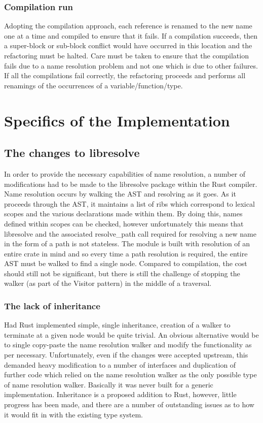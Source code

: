 \subsection{Compilation run}
Adopting the compilation approach, each reference is renamed to the new name one at a time and compiled to ensure that it fails. If a compilation succeeds, then a super-block or sub-block conflict would have occurred in this location and the refactoring must be halted. Care must be taken to ensure that the compilation fails due to a name resolution problem and not one which is due to other failures. If all the compilations fail correctly, the refactoring proceeds and performs all renamings of the occurrences of a variable/function/type.

\chapter{Specifics of the Implementation}\label{C:impl}

\section{The changes to libresolve}
In order to provide the necessary capabilities of name resolution, a number of modifications had to be made to the libresolve package within the Rust compiler. Name resolution occurs by walking the AST and resolving as it goes. As it proceeds through the AST, it maintains a list of ribs which correspond to lexical scopes and the various declarations made within them. By doing this, names defined within scopes can be checked, however unfortunately this means that libresolve and the associated resolve\_path call required for resolving a new name in the form of a path is not stateless. The module is built with resolution of an entire crate in mind and so every time a path resolution is required, the entire AST must be walked to find a single node. Compared to compilation, the cost should still not be significant, but there is still the challenge of stopping the walker (as part of the Visitor pattern) in the middle of a traversal. 

\subsection{The lack of inheritance}
Had Rust implemented simple, single inheritance, creation of a walker to terminate at a given node would be quite trivial. An obvious alternative would be to single copy-paste the name resolution walker and modify the functionality as per necessary. Unfortunately, even if the changes were accepted upstream, this demanded heavy modification to a number of interfaces and duplication of further code which relied on the name resolution walker as the only possible type of name resolution walker. Basically it was never built for a generic implementation. Inheritance is a proposed addition to Rust, however, little progress has been made, and there are a number of outstanding issues as to how it would fit in with the existing type system.

